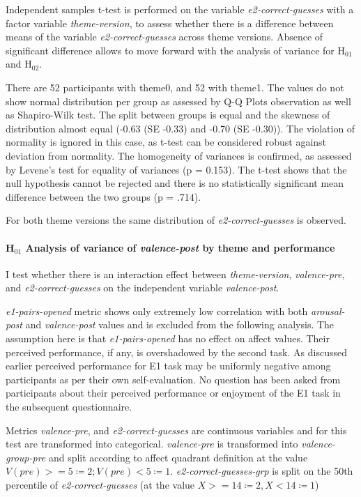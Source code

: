 	Independent samples t-test is performed on the variable \textit{e2-correct-guesses} with a factor variable \textit{theme-version}, to assess whether there is a difference between means of the variable \textit{e2-correct-guesses} across theme versions. Absence of significant difference allows to move forward with the analysis of variance for H$_{01}$ and H$_{02}$.
	
	There are 52 participants with theme0, and 52 with theme1. The values do not show normal distribution per group as assessed by Q-Q Plots observation as well as Shapiro-Wilk test. The split between groups is equal and the skewness of distribution almost equal (-0.63 (SE -0.33) and -0.70 (SE -0.30)). The violation of normality is ignored in this case, as t-test can be considered robust against deviation from normality. The homogeneity of variances is confirmed, as assessed by Levene's test for equality of variances (p = 0.153). The t-test shows that the null hypothesis cannot be rejected and there is no statistically significant mean difference between the two groups (p = .714).
	
	For both theme versions the same distribution of \textit{e2-correct-guesses} is observed.
	
	
	\paragraph{H$_{01}$ Analysis of variance of \textit{valence-post} by theme and performance}
	
	I test whether there is an interaction effect between \textit{theme-version}, \textit{valence-pre}, and \textit{e2-correct-guesses} on the independent variable \textit{valence-post}.
	
	\textit{e1-pairs-opened} metric shows only extremely low correlation with both \textit{arousal-post} and \textit{valence-post} values and is excluded from the following analysis. The assumption here is that \textit{e1-pairs-opened} has no effect on affect values. Their perceived performance, if any, is overshadowed by the second task. As discussed earlier perceived performance for E1 task may be uniformly negative among participants as per their own self-evaluation. No question has been asked from participants about their perceived performance or enjoyment of the E1 task in the subsequent questionnaire.
	
	Metrics \textit{valence-pre}, and \textit{e2-correct-guesses} are continuous variables and for this test are transformed into categorical.
	\textit{valence-pre} is transformed into \textit{valence-group-pre} and split according to affect quadrant definition at the value \( V(pre) >= 5 \coloneqq 2; V(pre) < 5 \coloneqq 1\). \textit{e2-correct-guesses-grp} is split on the 50th percentile of \textit{e2-correct-guesses} (at the value \(X >= 14 \coloneqq 2, X < 14 \coloneqq 1\))
	
